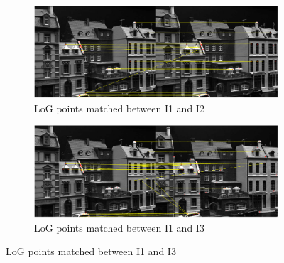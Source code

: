 \documentclass[11pt,a4paper]{article}
\begin{document}
\begin{figure}[H]
    \begin{subfigure}[t]{\textwidth}
        \includegraphics[width=\textwidth]{images/match_i1_i2_log.pdf}
        \caption{LoG points matched between I1 and I2}
        \label{fig:i1_i2_log}
    \end{subfigure}
    \begin{subfigure}[t]{\textwidth}
        \includegraphics[width=\textwidth]{images/match_i1_i3_log.pdf}
        \caption{LoG points matched between I1 and I3}
        \label{fig:i1_i3_log}
    \end{subfigure}
\end{figure}
\end{document}
